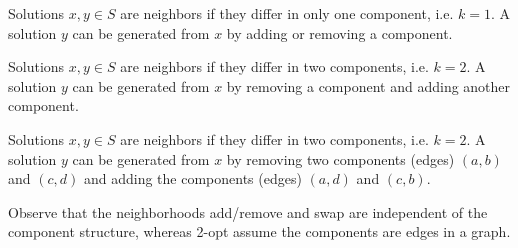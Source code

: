 \documentclass[12pt,a4paper,onecolumn]{amsart}
\begin{document}
\begin{tcolorbox}
	\begin{example}
	Solutions $x,y\in S$ are neighbors if they differ in only one component, i.e. $k = 1$. A solution $y$ can be generated from $x$ by adding or removing a component.
	\end{example}
	
	\begin{example}
	Solutions $x,y\in S$ are neighbors if they differ in two components, i.e. $k = 2$. A solution $y$ can be generated from $x$ by removing a component and adding another component. 
	\end{example}
	
	\begin{example}
	Solutions $x,y\in S$ are neighbors if they differ in two components, i.e. $k = 2$. A solution $y$ can be generated from $x$ by removing two components (edges) $(a,b)$ and $(c,d)$ and adding the components (edges) $(a,d)$ and $(c,b)$.
	\end{example}
\end{tcolorbox}

Observe that the neighborhoods add/remove and swap are independent of the component structure, whereas 2-opt assume the components are edges in a graph.
\end{document}
